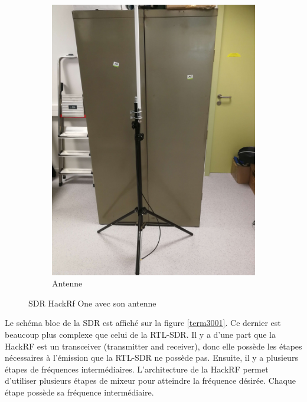 \begin{figure}[h]
\begin{subfigure}{0.4\textwidth}
\end{subfigure}
\hspace{0.5cm} %
\begin{subfigure}{0.4\textwidth}
  \centering
  \includegraphics[width=\textwidth]{images/pied.png}
  \caption{Antenne}
  \label{term340}
\end{subfigure}
\caption{SDR HackRf One avec son antenne}
\label{bothimages}
\end{figure}


Le schéma bloc de la \ac{SDR} est affiché sur la figure \ref{term3001}. Ce dernier est beaucoup plus complexe que celui de la RTL-SDR. Il y a d'une part que la HackRF est un transceiver (transmitter and receiver), donc elle possède les étapes nécessaires à l'émission que la RTL-SDR ne possède pas. Ensuite, il y a plusieurs étapes de fréquences intermédiaires. L'architecture de la HackRF \footnotemark[10] permet d'utiliser plusieurs étapes de mixeur pour atteindre la fréquence désirée. Chaque étape possède sa fréquence intermédiaire.


